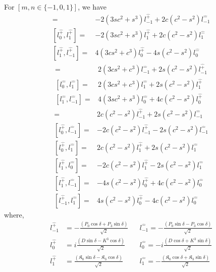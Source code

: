 \documentclass[]{article}
\numberwithin{equation}{section}
\begin{document}
{{For $[m,n\in\{-1,0,1\}]$, we have
\begin{align}
    [l^{\hat{+}}_{-1},l^{\hat{+}}_{0}]=&-2(3sc^2 + s^3)l^{\hat{+}}_{-1}+2c(c^2-s^2)l^{\hat{-}}_{-1}\\
    [l^{\hat{+}}_{0},l^{\hat{+}}_{1}]=&-2(3sc^2 + s^3)l^{\hat{+}}_{1}+2c(c^2-s^2)l^{\hat{-}}_{1}\\
    [l^{\hat{+}}_{1},l^{\hat{+}}_{-1}]=&4(3cs^2 + c^3)l^{\hat{+}}_{0}-4s(c^2-s^2)l^{\hat{-}}_{0}
\end{align}
\begin{align}
    [l^{\hat{-}}_{-1},l^{\hat{-}}_{0}]=&2(3cs^2 + c^3)l^{\hat{-}}_{-1}+2s(c^2-s^2)l^{\hat{+}}_{-1}\\
    [l^{\hat{-}}_{0},l^{\hat{-}}_{1}]=&2(3cs^2 + c^3)l^{\hat{-}}_{1}+2s(c^2-s^2)l^{\hat{+}}_{1}\\
    [l^{\hat{-}}_{1},l^{\hat{-}}_{-1}]=&4(3sc^2 + s^3)l^{\hat{-}}_{0}+4c(c^2-s^2)l^{\hat{+}}_{0}
\end{align}
\begin{align}
    [l^{\hat{+}}_{-1},l^{\hat{-}}_{0}]=&2c(c^2-s^2)l^{\hat{+}}_{-1}+2s(c^2-s^2)l^{\hat{-}}_{-1}\\
    [l^{\hat{+}}_{0},l^{\hat{-}}_{-1}]=&-2c(c^2-s^2)l^{\hat{+}}_{-1}-2s(c^2-s^2)l^{\hat{-}}_{-1}\\
    [l^{\hat{+}}_{0},l^{\hat{-}}_{1}]=&2c(c^2-s^2)l^{\hat{+}}_{1}+2s(c^2-s^2)l^{\hat{-}}_{1}\\
    [l^{\hat{+}}_{1},l^{\hat{-}}_{0}]=&-2c(c^2-s^2)l^{\hat{+}}_{1}-2s(c^2-s^2)l^{\hat{-}}_{1}\\
    [l^{\hat{+}}_{1},l^{\hat{-}}_{-1}]=&-4s(c^2-s^2)l^{\hat{+}}_{0}+4c(c^2-s^2)l^{\hat{-}}_{0}\\
    [l^{\hat{+}}_{-1},l^{\hat{-}}_{1}]=&4s(c^2-s^2)l^{\hat{+}}_{0}-4c(c^2-s^2)l^{\hat{-}}_{0}
\end{align}
where,
\begin{align}
    l^{\hat{+}}_{-1}&=-\frac{(P_{0}\cos{\delta}+P_{3}\sin{\delta})}{\sqrt{2}} &&l^{\hat{-}}_{-1}=-\frac{(P_{0}\sin{\delta}-P_{3}\cos{\delta})}{\sqrt{2}}\\
    l^{\hat{+}}_{0}&=i\frac{(D\sin{\delta}-K^{3}\cos{\delta})}{\sqrt{2}} &&l^{\hat{-}}_{0}=-i\frac{(D\cos{\delta}+K^{3}\sin{\delta})}{\sqrt{2}}\\
    l^{\hat{+}}_{1}&=\frac{(\mathfrak{K}_{0}\sin{\delta}-\mathfrak{K}_{3}\cos{\delta})}{\sqrt{2}} &&l^{\hat{-}}_{1}=-\frac{(\mathfrak{K}_{0}\cos{\delta}+\mathfrak{K}_{3}\sin{\delta})}{\sqrt{2}}
\end{align}
}}
\end{document}

